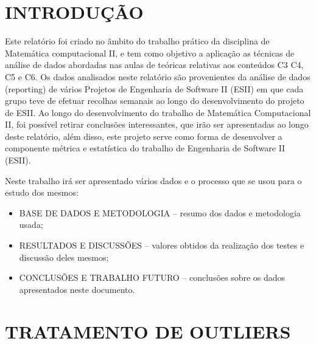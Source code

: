 \documentclass[%
 aip,
cp,  %
 amsmath,amssymb,%
 reprint,%
]{revtex4-2}
\begin{document}
\section{INTRODUÇÃO \label{sec:intro}}
Este relatório foi criado no âmbito do trabalho prático da disciplina de Matemática computacional II, e tem como objetivo a aplicação as técnicas de análise de dados abordadas nas aulas de teóricas relativas aos conteúdos C3 C4, C5 e C6. 
Os dados analisados neste relatório são provenientes da análise de dados (reporting) de vários Projetos de Engenharia de Software II (ESII) em que cada grupo teve de efetuar recolhas semanais ao longo do desenvolvimento do projeto de ESII. Ao longo do desenvolvimento do trabalho de Matemática Computacional II, foi possível retirar conclusões interessantes, que irão ser apresentadas ao longo deste relatório, além disso, este projeto serve como forma de desenvolver a componente métrica e estatística do trabalho de Engenharia de Software II (ESII).


Neste trabalho irá ser apresentado vários dados e o processo que se usou para o estudo dos mesmos:
\begin{itemize}
    \item BASE DE DADOS E METODOLOGIA – resumo dos dados e metodologia usada;
    \item RESULTADOS E DISCUSSÕES – valores obtidos da realização dos testes e discussão deles mesmos;
    \item CONCLUSÕES E TRABALHO FUTURO – conclusões sobre os dados apresentados neste documento.
\end{itemize}



 
 


\newpage
\section{TRATAMENTO DE OUTLIERS \label{sec:simulation}  } 
\end{document}
